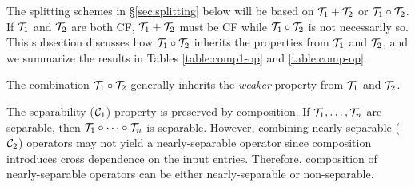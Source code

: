 The splitting schemes in \S\ref{sec:splitting} below will be based on ${\mathcal{T}}_1+{\mathcal{T}}_2$ or ${\mathcal{T}}_1\circ{\mathcal{T}}_2$. If ${\mathcal{T}}_1$ and ${\mathcal{T}}_2$ are both CF, ${\mathcal{T}}_1+{\mathcal{T}}_2$ must be CF while ${\mathcal{T}}_1\circ{\mathcal{T}}_2$ is not necessarily so. This subsection discusses how ${\mathcal{T}}_1\circ{\mathcal{T}}_2$ inherits the properties from ${\mathcal{T}}_1$ and ${\mathcal{T}}_2$, and we summarize the results in Tables \ref{table:comp1-op} and \ref{table:comp-op}.

The combination ${\mathcal{T}}_1\circ {\mathcal{T}}_2$ generally inherits the \emph{weaker} property from ${\mathcal{T}}_1$ and ${\mathcal{T}}_2$. %

The separability (${\mathcal{C}}_1$) property  is  preserved by composition. If ${\mathcal{T}}_1,\ldots,{\mathcal{T}}_n$ are separable, then ${\mathcal{T}}_1\circ\cdots\circ {\mathcal{T}}_n$ is separable.  However, combining  nearly-separable (${\mathcal{C}}_2$) operators  may not yield a nearly-separable operator since composition introduces cross dependence on the input entries. Therefore, composition of nearly-separable operators can be either nearly-separable or non-separable.


